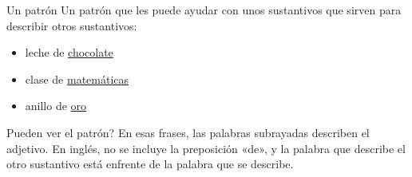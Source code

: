 \begin{conf}{Un patr\'on}
	Un patr\'on que les puede ayudar con unos sustantivos que sirven para describir otros sustantivos:
	\begin{itemize}
		\item leche de \underline{chocolate} \arr {}
		\item clase de \underline{matemáticas} \arr {}
		\item anillo de \underline{oro} \arr {}
	\end{itemize}

	\textquestiondown Pueden ver el patr\'on?
	En esas frases, las palabras subrayadas describen el adjetivo.
	En ingl\'es, no se incluye la preposici\'on «de», y la palabra que describe el otro sustantivo está enfrente de
	la palabra que se describe.
\end{conf}
